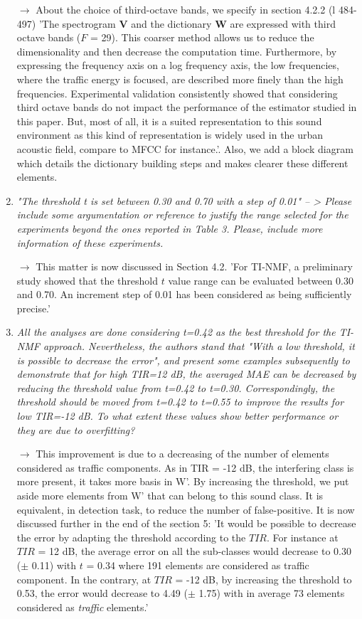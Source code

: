 \documentclass[10pt]{article}
\begin{document}
\begin{enumerate}
$\rightarrow$ About the choice of third-octave bands, we specify in section 4.2.2 (l 484-497) 'The spectrogram $\mathbf{V}$ and the dictionary $\mathbf{W}$ are expressed with third octave bands ($F$ = 29). This coarser method allows us to reduce the dimensionality and then decrease the computation time. Furthermore, by expressing the frequency axis on a log frequency axis, the low frequencies, where the traffic energy is focused, are described more finely than the high frequencies. Experimental validation consistently showed that considering third octave bands do not impact the performance of the estimator studied in this paper. But, most of all, it is a suited representation to this sound environment as this kind of representation is widely used in the urban acoustic field, compare to MFCC for instance.'. Also, we add a block diagram which details the dictionary building steps and makes clearer these different elements.

\item \emph{"The threshold t is set between 0.30 and 0.70 with a step of 0.01" -- > Please include some argumentation or reference to justify the range selected for the experiments beyond the ones reported in Table 3. Please, include more information of these experiments.}

$\rightarrow$ This matter is now discussed in Section 4.2. 'For TI-NMF, a preliminary study showed that the threshold $t$ value range can be evaluated between 0.30 and 0.70. An increment step of 0.01 has been considered as being sufficiently precise.'

\item \emph{All the analyses are done considering t=0.42 as the best threshold for the TI-NMF approach. Nevertheless, the authors stand that "With a low threshold, it is possible to decrease the error", and present some examples subsequently to demonstrate that for high TIR=12 dB, the averaged MAE can be decreased by reducing the threshold value from t=0.42 to t=0.30. Correspondingly, the threshold should be moved from t=0.42 to t=0.55 to improve the results for low TIR=-12 dB. To what extent these values show better performance or they are due to overfitting?}

$\rightarrow$ This improvement is due to a decreasing of the number of elements considered as traffic components. As in TIR = -12 dB, the interfering class is more present, it takes more basis in W'. By increasing the threshold, we put aside more elements from W' that can belong to this sound class. It is equivalent, in detection task, to reduce the number of false-positive. It is now discussed further in the end of the section 5: 'It would be possible to decrease the error by adapting the threshold according to the $TIR$. For instance at $TIR$ = 12 dB, the average error on all the sub-classes would decrease to 0.30 ($\pm$ 0.11) with $t$ = 0.34 where 191 elements are considered as traffic component. In the contrary, at $TIR$ = -12 dB, by increasing the threshold to 0.53, the error would decrease to 4.49 ($\pm$ 1.75) with in average 73 elements considered as \textit{traffic} elements.'


\end{enumerate}
\end{document}
